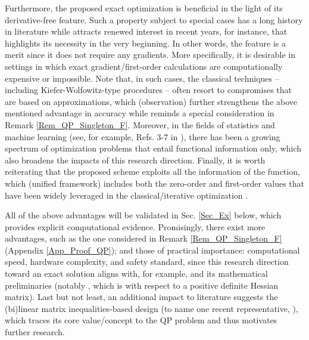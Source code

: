 \documentclass{imaman}
\numberwithin{equation}{section}
\begin{document}
Furthermore, the proposed exact optimization is beneficial in the light of its derivative-free feature. Such a property subject to special cases has a long history in literature while attracts renewed interest in recent years, for instance, \cite{DuJoWaWi:15} that highlights its necessity in the very beginning. In other words, the feature is a merit since it does not require any gradients. More specifically, it is desirable in settings in which exact gradient/first-order calculations are computationally expensive or impossible. Note that, in such cases, the classical techniques -- including Kiefer-Wolfowitz-type procedures \citep{KuYi:03} -- often resort to compromises that are based on approximations, which (observation) further strengthens the above mentioned advantage in accuracy while reminds a special consideration in Remark \ref{Rem_QP_Singleton_F}. Moreover, in the fields of statistics and machine learning (see, for example, Refs. 3-7 in \cite{DuJoWaWi:15}), there has been a growing spectrum of optimization problems that entail functional information only, which also broadens the impacts of this research direction. Finally, it is worth reiterating that the proposed scheme exploits all the information of the function, which (unified framework) includes both the zero-order \citep{DuJoWaWi:15} and first-order values that have been widely leveraged in the classical/iterative optimization \citep{Lu(Ye):03(16),NoWr:06}.

All of the above advantages will be validated in Sec. \ref{Sec_Ex} below, which provides explicit computational evidence. Promisingly, there exist more advantages, such as the one considered in Remark \ref{Rem_QP_Singleton_F} (Appendix \ref{App_Proof_QP}); and those of practical importance: computational speed, hardware complexity, and safety standard, since this research direction toward an exact solution aligns with, for example, \cite{JoFoTo:05} and its mathematical preliminaries (notably \cite{BeMoDuPi:02}, which is with respect to a positive definite Hessian matrix). Last but not least, an additional impact to literature suggests the (bi)linear matrix inequalities-based design (to name one recent representative, \cite{MiHa:acc}), which traces its core value/concept to the QP problem and thus motivates further research.
\end{document}
